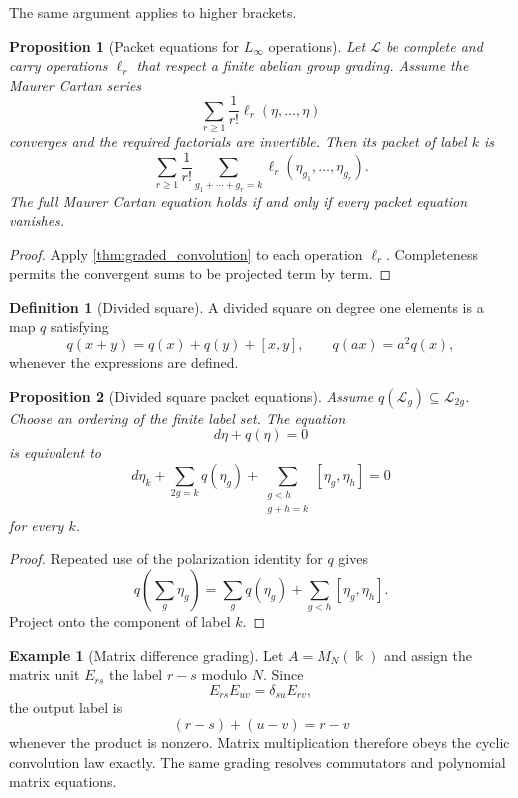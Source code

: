 \documentclass{aomart}
\newtheorem{proposition}[proposition]{Proposition}
\theoremstyle{definition}
\newtheorem{definition}[definition]{Definition}
\newtheorem{example}[example]{Example}
\theoremstyle{remark}
\newcommand{\bbk}{\Bbbk}
\newcommand{\Lcal}{\mathcal L}
\begin{document}
The same argument applies to higher brackets.

\begin{proposition}[Packet equations for $L_\infty$ operations]\label{prop:packet_l_infinity}
Let $\Lcal$ be complete and carry operations $\ell_r$ that respect a finite abelian group grading.  Assume the Maurer Cartan series
\[
\sum_{r\ge1}\frac1{r!}\ell_r(\eta,\ldots,\eta)
\]
converges and the required factorials are invertible.  Then its packet of label $k$ is
\[
\sum_{r\ge1}\frac1{r!}
\sum_{g_1+\cdots+g_r=k}
\ell_r(\eta_{g_1},\ldots,\eta_{g_r}).
\]
The full Maurer Cartan equation holds if and only if every packet equation vanishes.
\end{proposition}

\begin{proof}
Apply \cref{thm:graded_convolution} to each operation $\ell_r$.  Completeness permits the convergent sums to be projected term by term.
\end{proof}

\begin{definition}[Divided square]\label{def:divided_square}
A divided square on degree one elements is a map $q$ satisfying
\[
q(x+y)=q(x)+q(y)+[x,y],
\qquad
q(ax)=a^2q(x),
\]
whenever the expressions are defined.
\end{definition}

\begin{proposition}[Divided square packet equations]\label{prop:divided_square_packets}
Assume $q(\Lcal_g)\subseteq\Lcal_{2g}$.  Choose an ordering of the finite label set.  The equation
\[
d\eta+q(\eta)=0
\]
is equivalent to
\[
d\eta_k
+
\sum_{2g=k}q(\eta_g)
+
\sum_{\substack{g<h\\g+h=k}}[\eta_g,\eta_h]
=0
\]
for every $k$.
\end{proposition}

\begin{proof}
Repeated use of the polarization identity for $q$ gives
\[
q\left(\sum_g\eta_g\right)
=
\sum_gq(\eta_g)
+
\sum_{g<h}[\eta_g,\eta_h].
\]
Project onto the component of label $k$.
\end{proof}


\begin{example}[Matrix difference grading]\label{ex:matrix_difference_grading}
Let $A=M_N(\bbk)$ and assign the matrix unit $E_{rs}$ the label $r-s$ modulo $N$.  Since
\[
E_{rs}E_{uv}=\delta_{su}E_{rv},
\]
the output label is
\[
(r-s)+(u-v)=r-v
\]
whenever the product is nonzero.  Matrix multiplication therefore obeys the cyclic convolution law exactly.  The same grading resolves commutators and polynomial matrix equations.
\end{example}
\end{document}
